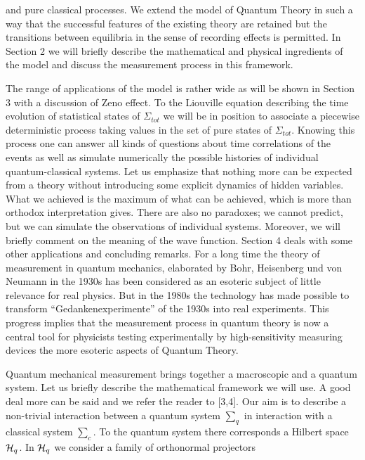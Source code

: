 and pure classical processes.
We extend the model of Quantum Theory in such a way that the successful
features of the existing theory are retained but the transitions
between equilibria in the sense of recording effects is permitted.
In Section 2 we will briefly describe the mathematical and physical
ingredients of the model and discuss the measurement process in this
framework.\par
The range of applications of the model is rather wide as will be
shown in Section 3 with a discussion of Zeno effect. To the Liouville
equation describing the time evolution of statistical states of
$\Sigma_{tot}$ we will be in position to associate a piecewise
deterministic process taking values in the set of pure states of
$\Sigma_{tot}$. Knowing this process one can answer all kinds of
questions about time correlations of the events as well as simulate
numerically the possible histories of individual quantum-classical
systems. Let us
emphasize that nothing more can be expected from a theory without
introducing some explicit dynamics of hidden variables. What we
achieved is the maximum of what can be achieved, which is more than
orthodox interpretation gives. There are also no paradoxes; we cannot
predict, but we can simulate the observations of individual systems.
Moreover, we will briefly comment on the meaning of the wave
function. Section 4 deals with some other applications and concluding
remarks.
\bigskip
{}\medskip
For a long time the theory of measurement in quantum mechanics,
elaborated by Bohr, Heisenberg und von Neumann in the 1930s has
been considered as an esoteric subject of little relevance for real
physics. But in the 1980s the technology has made possible to transform
``Gedankenexperimente'' of the 1930s into real experiments. This
progress implies that the measurement process in quantum theory is now
a central tool for physicists testing experimentally by high-sensitivity
measuring devices the more esoteric aspects of Quantum Theory.\par
Quantum mechanical measurement brings together a macroscopic and a
quantum system.
\bigskip
{}
\medskip
Let us briefly describe the mathematical framework we will use. A
good deal more can be said and we refer the reader to [3,4]. Our aim
is to describe a non-trivial interaction between a quantum system
$\sum_q$ in interaction with a classical system $\sum_c$.
To the quantum system there corresponds a Hilbert space ${\cal H}_q$.
In ${\cal H}_q$ we consider a family of orthonormal projectors
